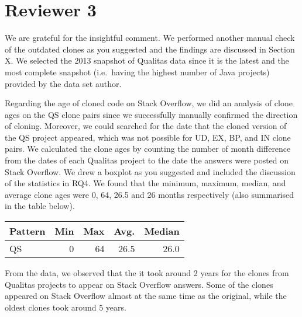 \documentclass[a4paper,twoside,10pt]{reviewresponse}
\begin{document}
\section{Reviewer 3}


We are grateful for the insightful comment. We performed another manual check of the outdated clones as you suggested and the findings are discussed in Section X. We selected the 2013 snapshot of Qualitas data since it is the latest and the most complete snapshot (i.e.~having the highest number of Java projects) provided by the data set author. 

Regarding the age of cloned code on Stack Overflow, we did an analysis of clone ages on the QS clone pairs since we successfully manually confirmed the direction of cloning. Moreover, we could searched for the date that the cloned version of the QS project appeared, which was not possible for UD, EX, BP, and IN clone pairs. 
We calculated the clone ages by counting the number of month difference from the dates of each Qualitas project to the date the answers were posted on Stack Overflow.
We drew a boxplot as you suggested and included the discussion of the statistics in RQ4. We found that the minimum, maximum, median, and average clone ages were 0, 64, 26.5 and 26 months respectively (also summarised in the table below).

\begin{table}[H]
	\centering
\begin{tabular}{lrrrr}
	\toprule
	Pattern & Min & Max & Avg. & Median \\
	\midrule
	QS & 0 & 64 & 26.5 & 26.0 \\
	\bottomrule
\end{tabular}
\end{table}

From the data, we observed that the it took around 2 years for the clones from Qualitas projects to appear on Stack Overflow answers. Some of the clones appeared on Stack Overflow almost at the same time as the original, while the oldest clones took around 5 years.
\end{document}
